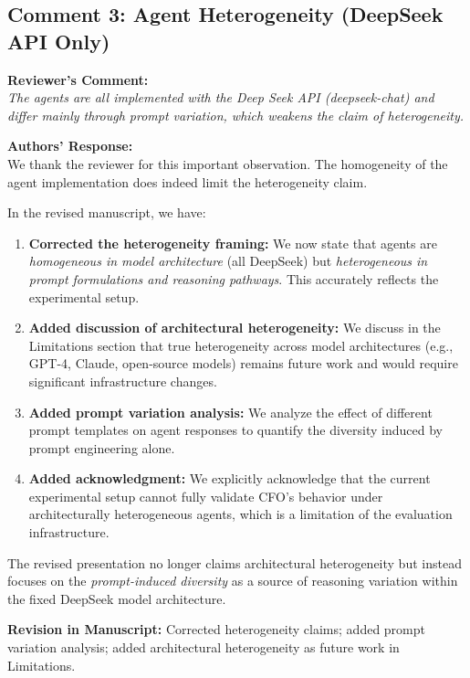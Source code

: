 \documentclass[11pt,a4paper]{article}
\newcommand{\reviewercomment}[1]{%
  \vspace{6pt}\noindent\textbf{\textcolor{reviewercolor}{Reviewer's Comment:}}\\
  \textcolor{reviewercolor}{\itshape #1}\vspace{4pt}}
\newcommand{\response}[1]{%
  \noindent\textbf{\textcolor{responsecolor}{Authors' Response:}}\\
  #1\vspace{8pt}}
\newcommand{\revision}[1]{%
  \noindent\textbf{Revision in Manuscript:} #1\vspace{4pt}}
\begin{document}
\subsection*{Comment 3: Agent Heterogeneity (DeepSeek API Only)}

\reviewercomment{The agents are all implemented with the Deep Seek API (deepseek-chat) and differ mainly through prompt variation, which weakens the claim of heterogeneity.}

\response{We thank the reviewer for this important observation. The homogeneity of the agent implementation does indeed limit the heterogeneity claim.

In the revised manuscript, we have:

\begin{enumerate}[nosep]
\item \textbf{Corrected the heterogeneity framing:} We now state that agents are \textit{homogeneous in model architecture} (all DeepSeek) but \textit{heterogeneous in prompt formulations and reasoning pathways}. This accurately reflects the experimental setup.

\item \textbf{Added discussion of architectural heterogeneity:} We discuss in the Limitations section that true heterogeneity across model architectures (e.g., GPT-4, Claude, open-source models) remains future work and would require significant infrastructure changes.

\item \textbf{Added prompt variation analysis:} We analyze the effect of different prompt templates on agent responses to quantify the diversity induced by prompt engineering alone.

\item \textbf{Added acknowledgment:} We explicitly acknowledge that the current experimental setup cannot fully validate CFO's behavior under architecturally heterogeneous agents, which is a limitation of the evaluation infrastructure.
\end{enumerate}

The revised presentation no longer claims architectural heterogeneity but instead focuses on the \textit{prompt-induced diversity} as a source of reasoning variation within the fixed DeepSeek model architecture.}

\revision{Corrected heterogeneity claims; added prompt variation analysis; added architectural heterogeneity as future work in Limitations.}
\end{document}
